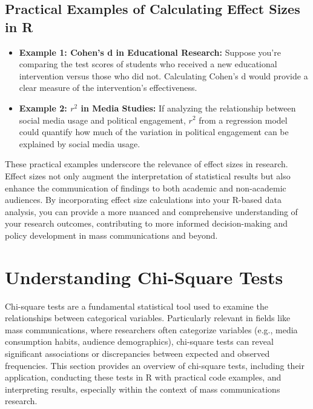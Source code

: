 \documentclass[
]{book}
\begin{document}
\hypertarget{practical-examples-of-calculating-effect-sizes-in-r}{%
\subsection*{Practical Examples of Calculating Effect Sizes in R}\label{practical-examples-of-calculating-effect-sizes-in-r}}

\begin{itemize}
\item
  \textbf{Example 1: Cohen's d in Educational Research:} Suppose you're comparing the test scores of students who received a new educational intervention versus those who did not. Calculating Cohen's d would provide a clear measure of the intervention's effectiveness.
\item
  \textbf{Example 2: \(r^2\) in Media Studies:} If analyzing the relationship between social media usage and political engagement, \(r^2\) from a regression model could quantify how much of the variation in political engagement can be explained by social media usage.
\end{itemize}

These practical examples underscore the relevance of effect sizes in research. Effect sizes not only augment the interpretation of statistical results but also enhance the communication of findings to both academic and non-academic audiences. By incorporating effect size calculations into your R-based data analysis, you can provide a more nuanced and comprehensive understanding of your research outcomes, contributing to more informed decision-making and policy development in mass communications and beyond.

\hypertarget{understanding-chi-square-tests}{%
\section{Understanding Chi-Square Tests}\label{understanding-chi-square-tests}}

Chi-square tests are a fundamental statistical tool used to examine the relationships between categorical variables. Particularly relevant in fields like mass communications, where researchers often categorize variables (e.g., media consumption habits, audience demographics), chi-square tests can reveal significant associations or discrepancies between expected and observed frequencies. This section provides an overview of chi-square tests, including their application, conducting these tests in R with practical code examples, and interpreting results, especially within the context of mass communications research.
\end{document}

